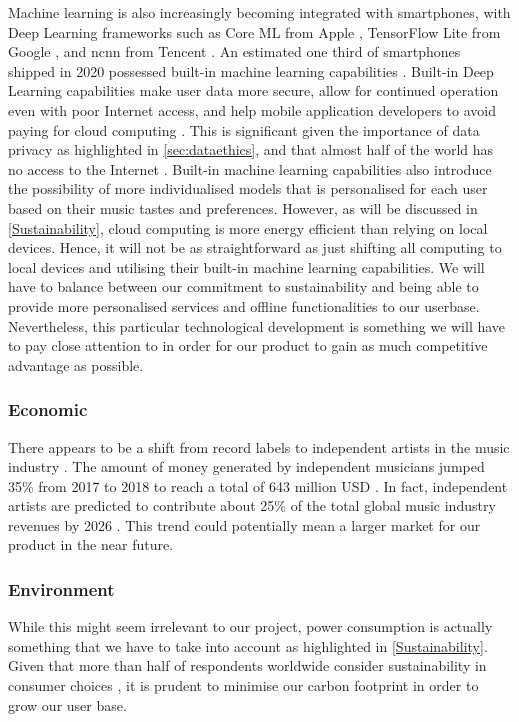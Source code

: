   Machine learning is also increasingly becoming integrated with smartphones, with Deep Learning frameworks such as Core ML from Apple \cite{applecoreml}, TensorFlow Lite from Google \cite{tensorflow}, and ncnn from Tencent \cite{tencent}. An estimated one third of smartphones shipped in 2020 possessed built-in machine learning capabilities \cite{counterpointML}. Built-in Deep Learning capabilities make user data more secure, allow for continued operation even with poor Internet access, and help mobile application developers to avoid paying for cloud computing \cite{10.1145/2644865.2541967} \cite{https://doi.org/10.48550/arxiv.1704.04861} \cite{DL3} \cite{7460664} \cite{10.1145/2750858.2804262} \cite{10.1145/3210240.3210337} \cite{10.1145/3241539.3241563} \cite{10.1145/3005448}. This is significant given the importance of data privacy as highlighted in \cref{sec:dataethics}, and that almost half of the world has no access to the Internet \cite{cisco_2022}. Built-in machine learning capabilities also introduce the possibility of more individualised models that is personalised for each user based on their music tastes and preferences. However, as will be discussed in \cref{Sustainability}, cloud computing is more energy efficient than relying on local devices. Hence, it will not be as straightforward as just shifting all computing to local devices and utilising their built-in machine learning capabilities. We will have to balance between our commitment to sustainability and being able to provide more personalised services and offline functionalities to our userbase. Nevertheless, this particular technological development is something we will have to pay close attention to in order for our product to gain as much competitive advantage as possible.

\subsubsection{Economic}
There appears to be a shift from record labels to independent artists in the music industry \cite{worldwide2020}. The amount of money generated by independent musicians jumped 35\% from 2017 to 2018 to reach a total of 643 million USD \cite{independentartists}. In fact, independent artists are predicted to contribute about 25\% of the total global music industry revenues by 2026 \cite{rollingstone}. This trend could potentially mean a larger market for our product in the near future.

\subsubsection{Environment}
While this might seem irrelevant to our project, power consumption is actually something that we have to take into account as highlighted in \cref{Sustainability}. Given that more than half of respondents worldwide consider sustainability in consumer choices \cite{GlobalSurvey}, it is prudent to minimise our carbon footprint in order to grow our user base.

